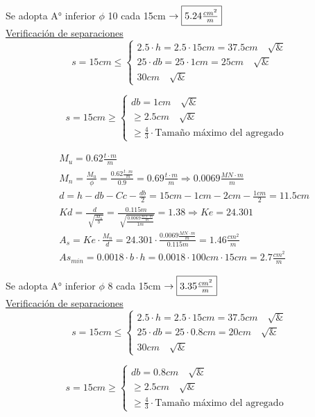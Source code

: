 \begin{enumerate}
\begin{itemize}
Se adopta A° inferior $\phi$ 10 cada 15cm $\rightarrow \framebox{$5.24 \frac{cm^2}{m}$}$ \\

\underline{Verificación de separaciones}\\

\[ s = 15cm \leq \left\{ \begin{array}{ll}
         2.5 \cdot h = 2.5 \cdot 15cm = 37.5cm \quad \surd & \\
         25 \cdot db = 25 \cdot 1cm = 25cm \quad \surd &\\
         30cm \quad \surd & \end{array} \right. \] 
         
\[ s = 15cm \geq \left\{ \begin{array}{ll}
         db = 1cm \quad \surd & \\
         \geq 2.5cm \quad \surd &\\
         \geq \frac{4}{3} \cdot \text{Tamaño máximo del agregado} & \end{array} \right. \] 

\begin{align*}
& M_u = 0.62 \frac{t \cdot m}{m} \\
& M_n = \frac{M_u}{\phi} = \frac{0.62 \frac{t \cdot m}{m}}{0.9} = 0.69 \frac{t \cdot m}{m} \Rightarrow 0.0069 \frac{MN \cdot m}{m} \\
& d = h -db - Cc - \frac{db}{2} = 15cm - 1cm - 2cm - \frac{1cm}{2}= 11.5cm \\
& Kd = \frac{d}{\sqrt[]{\frac{M_n}{b}}} = \frac{0.115m}{\sqrt[]{\frac{0.0069 \frac{MN \cdot m}{m}}{1m}}} = 1.38 \Rightarrow Ke = 24.301 \\
& A_s = Ke \cdot \frac{M_n}{d} = 24.301 \cdot \frac{0.0069 \frac{MN \cdot m}{m}}{0.115m} = 1.46 \frac{cm^2}{m}\\
& As_{min} = 0.0018 \cdot b \cdot h = 0.0018 \cdot 100cm \cdot 15cm = 2.7 \frac{cm^2}{m}
\end{align*}

Se adopta A° inferior $\phi$ 8 cada 15cm $\rightarrow \framebox{$3.35 \frac{cm^2}{m}$}$ \\

\underline{Verificación de separaciones}\\

\[ s = 15cm \leq \left\{ \begin{array}{ll}
         2.5 \cdot h = 2.5 \cdot 15cm = 37.5cm \quad \surd & \\
         25 \cdot db = 25 \cdot 0.8cm = 20cm \quad \surd &\\
         30cm \quad \surd & \end{array} \right. \] 
         
\[ s = 15cm \geq \left\{ \begin{array}{ll}
         db = 0.8cm \quad \surd & \\
         \geq 2.5cm \quad \surd &\\
         \geq \frac{4}{3} \cdot \text{Tamaño máximo del agregado} & \end{array} \right. \] 

\end{itemize}
\end{enumerate}